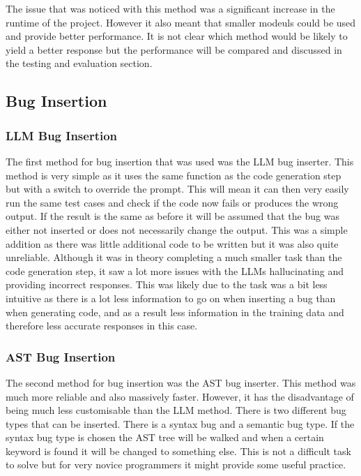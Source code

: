 \documentclass[12pt]{extarticle}
\begin{document}
The issue that was noticed with this method was a significant increase in the runtime of the project. However it also meant that smaller modeuls could be used and provide better performance. It is not clear which method would be likely to yield a better response but the performance will be compared and discussed in the testing and evaluation section.

\subsection{Bug Insertion}
\subsubsection{LLM Bug Insertion}

The first method for bug insertion that was used was the LLM bug inserter. This method is very simple as it uses the same function as the code generation step but with a switch to override the prompt. This will mean it can then very easily run the same test cases and check if the code now fails or produces the wrong output. If the result is the same as before it will be assumed that the bug was either not inserted or does not necessarily change the output. This was a simple addition as there was little additional code to be written but it was also quite unreliable. Although it was in theory completing a much smaller task than the code generation step, it saw a lot more issues with the LLMs hallucinating and providing incorrect responses. This was likely due to the task was a bit less intuitive as there is a lot less information to go on when inserting a bug than when generating code, and as a result less information in the training data and therefore less accurate responses in this case.

\subsubsection{AST Bug Insertion}

The second method for bug insertion was the AST bug inserter. This method was much more reliable and also massively faster. However, it has the disadvantage of being much less customisable than the LLM method. There is two different bug types that can be inserted. There is a syntax bug and a semantic bug type. If the syntax bug type is chosen the AST tree will be walked and when a certain keyword is found it will be changed to something else. This is not a difficult task to solve but for very novice programmers it might provide some useful practice.
\end{document}
